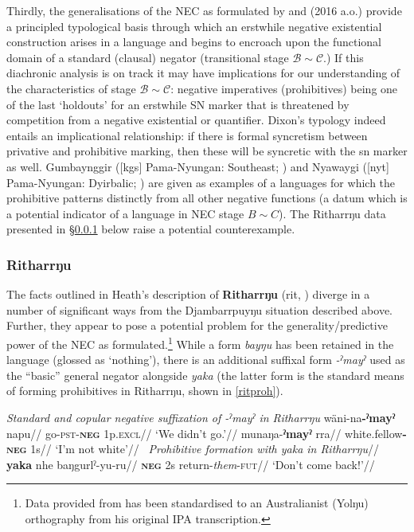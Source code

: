 { Thirdly, the generalisations of the NEC as formulated by \citet{Croft1991} and \citeauthor{Veselinova2016} (2016 a.o.) provide a principled typological basis through which an erstwhile negative existential construction arises in a language and begins to encroach upon the functional domain of a standard (clausal) negator (transitional stage $\mathcal {B\sim C}$.) If this diachronic analysis is on track it may have implications for our understanding of the characteristics of stage $\mathcal{B\sim C}$: negative imperatives (prohibitives) being one of the last `holdouts' for an erstwhile SN marker that is threatened by competition from a negative existential or quantifier. %
 Dixon's typology \citeyearpar[84]{Dixon2002a} indeed entails an implicational relationship: if there is formal syncretism between privative and prohibitive marking, then these will be syncretic with the \gls{sn} marker as well. Gumbaynggir ([\gls{kgs}] Pama-Nyungan: Southeast; \citealt{Eades1979}) and Nyawaygi ([\gls{nyt}] Pama-Nyungan: Dyirbalic; \citealt{Dixon1983}) are given as examples of a languages for which the prohibitive patterns distinctly from all other negative functions (a datum which is a potential indicator of a language in NEC stage $B\sim C$). The Ritharrŋu data presented in §\ref{secrit} below raise a potential counterexample.
\label{secdjr}

\subsubsection{Ritharrŋu}\label{secrit}


The facts outlined in Heath's description of {\bf Ritharrŋu} (\gls{rit}, \citeyear{Heath1980}) diverge in a number of significant ways from the Djambarrpuyŋu situation described above. Further, they appear to pose a potential problem for the generality/predictive power of the NEC as formulated.\footnote{Data provided from \citet{Heath1980} has been standardised to an Australianist (Yolŋu) orthography from his original IPA transcription.} While a form \textit{bayŋu} has been retained in the language (glossed as `nothing'), there is an additional suffixal form \textit{-ˀmayˀ} used as the ``basic'' \citep[101]{Heath1980} general negator alongside \textit{yaka} (the latter form is the standard means of forming prohibitives in Ritharrŋu, shown in \ref{ritproh}).

\pex\textit{Standard and copular negative suffixation of {\em -ˀmayˀ} in Ritharrŋu}
\a\begingl\gla wäni-na\textbf{-ˀmayˀ} napu//
\glb go-\textsc{pst-\textbf{neg}} 1\gls{p}\textsc{.excl}//
\glft `We didn't go.'//\endgl
\a\begingl\gla munaŋa-\textbf{ˀmayˀ} rra//
\glb white.fellow\textsc{\textbf{-neg}} 1s//
\glft`I'm not white'//\endgl\xe 
\pex~\label{ritproh}\begingl\glpreamble\textit{Prohibitive formation with {\em yaka} in Ritharrŋu}//
\gla \textbf{yaka} nhe baŋgurlˀ-yu-ru//
\glb \textsc{\textbf{neg}} 2\gls{s} return-\textit{them}-\textsc{fut}//
\glft`Don't come back!'//\endgl\xe

}
